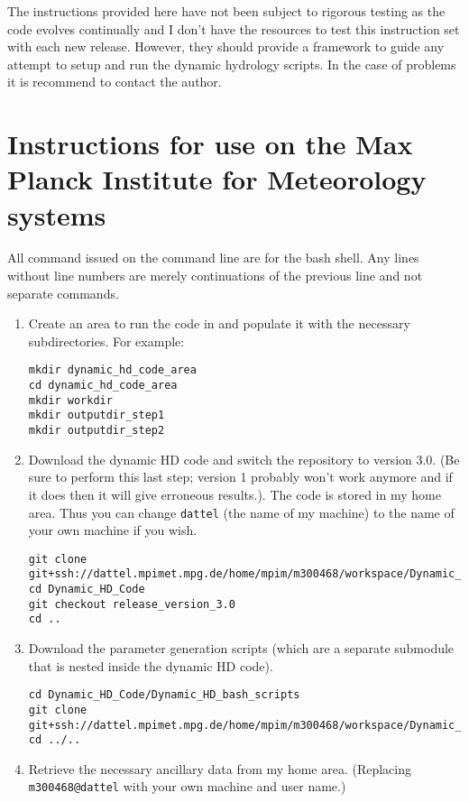 \documentclass{article}
\begin{document}
The instructions provided here have not been subject to rigorous testing as the code evolves continually and I don't have the resources to test this instruction set with each new release. However, they should provide a framework to guide any attempt to setup and run the dynamic hydrology scripts. In the case of problems it is recommend to contact the author.
\section{Instructions for use on the Max Planck Institute for Meteorology systems} \label{section-max-planck-instructions}
All command issued on the command line are for the bash shell. Any lines without line numbers are merely continuations of the previous line and not separate commands.
\begin{enumerate}
\item Create an area to run the code in and populate it with the necessary subdirectories. For example:
\begin{lstlisting}[style=bash_input]
mkdir dynamic_hd_code_area
cd dynamic_hd_code_area
mkdir workdir
mkdir outputdir_step1
mkdir outputdir_step2
\end{lstlisting}
\item Download the dynamic HD code and switch the repository to version 3.0. (Be sure to perform this last step; version 1 probably won't work anymore and if it does then it will give erroneous results.). The code is stored in my home area. Thus you can change  \lstinline[style=bash_input]{dattel} (the name of my machine) to the name of your own machine if you wish.
\begin{lstlisting}[style=bash_input,breaklines=true]
git clone git+ssh://dattel.mpimet.mpg.de/home/mpim/m300468/workspace/Dynamic_HD_Code
cd Dynamic_HD_Code
git checkout release_version_3.0
cd ..
\end{lstlisting}
\item Download the parameter generation scripts (which are a separate submodule that is nested inside the dynamic HD code).
\begin{lstlisting}[style=bash_input,breaklines=true]
cd Dynamic_HD_Code/Dynamic_HD_bash_scripts
git clone git+ssh://dattel.mpimet.mpg.de/home/mpim/m300468/workspace/Dynamic_HD_Code/Dynamic_HD_bash_scripts/parameter_generation_scripts
cd ../..
\end{lstlisting}
\item Retrieve the necessary ancillary data from my home area. (Replacing \lstinline[style=bash_input]{m300468@dattel} with your own machine and user name.)

\end{enumerate}
\end{document}
